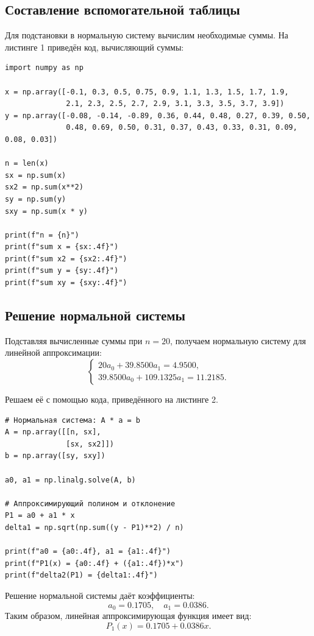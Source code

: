 \subsection{Составление вспомогательной таблицы}
Для подстановки в нормальную систему вычислим необходимые суммы.
На листинге 1 приведён код, вычисляющий суммы:
\begin{lstlisting}[style=pythonstyle,caption={Вычисление вспомогательных сумм}]
import numpy as np

x = np.array([-0.1, 0.3, 0.5, 0.75, 0.9, 1.1, 1.3, 1.5, 1.7, 1.9,
              2.1, 2.3, 2.5, 2.7, 2.9, 3.1, 3.3, 3.5, 3.7, 3.9])
y = np.array([-0.08, -0.14, -0.89, 0.36, 0.44, 0.48, 0.27, 0.39, 0.50,
              0.48, 0.69, 0.50, 0.31, 0.37, 0.43, 0.33, 0.31, 0.09, 0.08, 0.03])

n = len(x)
sx = np.sum(x)
sx2 = np.sum(x**2)
sy = np.sum(y)
sxy = np.sum(x * y)

print(f"n = {n}")
print(f"sum x = {sx:.4f}")
print(f"sum x2 = {sx2:.4f}")
print(f"sum y = {sy:.4f}")
print(f"sum xy = {sxy:.4f}")
\end{lstlisting}

\subsection{Решение нормальной системы}
Подставляя вычисленные суммы при $n = 20$, получаем нормальную систему для линейной аппроксимации:
\[
\left\{
\begin{array}{l}
20 a_0 + 39.8500 a_1 = 4.9500, \\
39.8500 a_0 + 109.1325 a_1 = 11.2185.
\end{array}
\right.
\]

Решаем её с помощью кода, приведённого на листинге 2.

\begin{lstlisting}[style=pythonstyle,caption={Линейная аппроксимация МНК}]
# Нормальная система: A * a = b
A = np.array([[n, sx],
              [sx, sx2]])
b = np.array([sy, sxy])

a0, a1 = np.linalg.solve(A, b)

# Аппроксимирующий полином и отклонение
P1 = a0 + a1 * x
delta1 = np.sqrt(np.sum((y - P1)**2) / n)

print(f"a0 = {a0:.4f}, a1 = {a1:.4f}")
print(f"P1(x) = {a0:.4f} + ({a1:.4f})*x")
print(f"delta2(P1) = {delta1:.4f}")
\end{lstlisting}

Решение нормальной системы даёт коэффициенты:
\[
a_0 = 0.1705, \quad a_1 = 0.0386.
\]
Таким образом, линейная аппроксимирующая функция имеет вид:
\[
P_1(x) = 0.1705 + 0.0386 x.
\]

